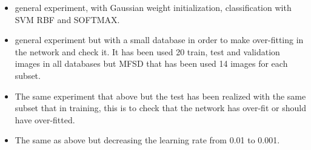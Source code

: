 \begin{itemize}
\item general experiment, with Gaussian weight initialization, classification with SVM RBF and SOFTMAX.
\item general experiment but with a small database in order to make over-fitting in the network and check it. It has been used 20 train, test and validation images in all databases but MFSD that has been used 14 images for each subset.
\item The same experiment that above but the test has been realized with the same subset that in training, this is to check that the network has over-fit or should have over-fitted.
\item The same as above but decreasing the learning rate from 0.01 to 0.001. \\
\end{itemize}


